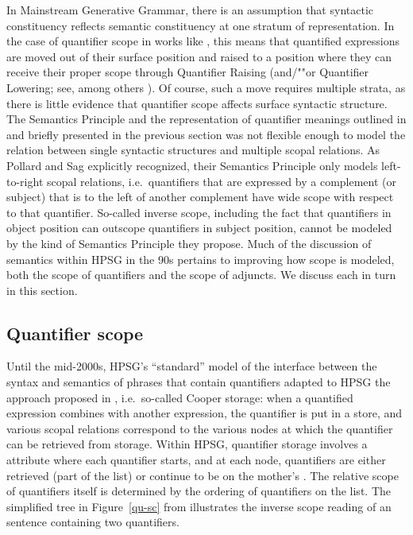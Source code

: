 \documentclass[output=paper
	        ,collection
	        ,collectionchapter
 	        ,biblatex
                ,babelshorthands
                ,newtxmath
                ,draftmode
                ,colorlinks, citecolor=brown
]{langscibook}
\begin{document}
In Mainstream Generative Grammar, there is an assumption that syntactic constituency reflects semantic constituency at one stratum of representation. In the case of quantifier scope in works like \citet{May1985}, this means that quantified expressions are moved out of their surface position and raised to a position where they can receive their proper scope through Quantifier Raising (and/""or Quantifier Lowering; see, among others \citealt{Hornstein1995}). Of course, such a move requires multiple strata, as there is little evidence that quantifier scope affects surface syntactic structure. The Semantics Principle and the representation of quantifier meanings outlined in \citet{PollardandSag1987} and briefly presented in the previous section was not flexible enough to model the relation between single syntactic structures and multiple scopal relations. As Pollard and Sag explicitly recognized, their Semantics Principle only models left-to-right scopal relations, i.e.\ quantifiers that are expressed by a complement (or subject) that is to the left of another complement have wide scope with respect to that quantifier. So-called inverse scope, including the fact that quantifiers in object position can outscope quantifiers in subject position, cannot be modeled by the kind of Semantics Principle they propose. Much of the discussion of semantics within HPSG in the 90s pertains to improving how scope is modeled, both the scope of quantifiers and the scope of adjuncts. We discuss each in turn in this section.


\subsection{Quantifier scope}

Until the mid-2000s, HPSG's ``standard'' model of the interface between the syntax and semantics of phrases that contain quantifiers adapted to HPSG the approach proposed in \citet{Cooper1975,Cooper1983}, i.e.\ so-called Cooper storage: when a quantified expression combines with another expression, the quantifier is put in a store, and various scopal relations correspond to the various nodes at which the quantifier can be retrieved from storage. Within HPSG, quantifier storage involves a  attribute where each quantifier starts, and at each node, quantifiers are either retrieved (part of the  list) or continue to be on the mother's . The relative scope of quantifiers itself is determined by the ordering of quantifiers on the  list. The simplified tree in Figure~\ref{qu-sc} from \citet[324]{PollardandSag1994} illustrates the inverse scope reading of an  sentence containing two quantifiers.
\end{document}
